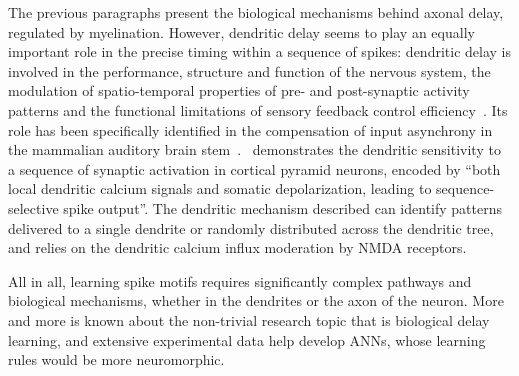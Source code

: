 \documentclass[brainsci, %
               review,submit,pdftex,moreauthors
               ]{Definitions/mdpi}
\begin{document}
The previous paragraphs present the biological mechanisms behind axonal delay, regulated by myelination. However, dendritic delay seems to play an equally important role in the precise timing within a sequence of spikes: dendritic delay is involved in the performance, structure and function of the nervous system, the modulation of spatio-temporal properties of pre- and post-synaptic activity patterns and the functional limitations of sensory feedback control efficiency~\citep{madadi_asl_dendritic_2018}. Its role has been specifically identified in the compensation of input asynchrony in the mammalian auditory brain stem~\citep{spencer_compensation_2018}.~\citet{branco_dendritic_2010} demonstrates the dendritic sensitivity to a sequence of synaptic activation in cortical pyramid neurons, encoded by ``both local dendritic calcium signals and somatic depolarization, leading to sequence-selective spike output''. The dendritic mechanism described can identify patterns delivered to a single dendrite or randomly distributed across the dendritic tree, and relies on the dendritic calcium influx moderation by NMDA receptors.

All in all, learning spike motifs requires significantly complex pathways and biological mechanisms, whether in the dendrites or the axon of the neuron. More and more is known about the non-trivial research topic that is biological delay learning, and extensive experimental data help develop ANNs, whose learning rules would be more neuromorphic. 
%
\end{document}
